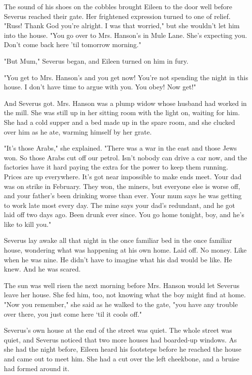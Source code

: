\documentclass[a4paper,11pt]{article}
\begin{document}
The sound of his shoes on the cobbles brought Eileen to the door well before Severus reached their gate. Her frightened expression turned to one of relief. "Russ! Thank God you're alright. I was that worried," but she wouldn't let him into the house. "You go over to Mrs. Hanson's in Mule Lane. She's expecting you. Don't come back here 'til tomorrow morning."

"But Mum," Severus began, and Eileen turned on him in fury.

"You get to Mrs. Hanson's and you get now! You're not spending the night in this house. I don't have time to argue with you. You obey! Now get!"

And Severus got. Mrs. Hanson was a plump widow whose husband had worked in the mill. She was still up in her sitting room with the light on, waiting for him. She had a cold supper and a bed made up in the spare room, and she clucked over him as he ate, warming himself by her grate.

"It's those Arabs," she explained. "There was a war in the east and those Jews won. So those Arabs cut off our petrol. Isn't nobody can drive a car now, and the factories have it hard paying the extra for the power to keep them running. Prices are up everywhere. It's got near impossible to make ends meet. Your dad was on strike in February. They won, the miners, but everyone else is worse off, and your father's been drinking worse than ever. Your mum says he was getting to work late most every day. The mine says your dad's redundant, and he got laid off two days ago. Been drunk ever since. You go home tonight, boy, and he's like to kill you."

Severus lay awake all that night in the once familiar bed in the once familiar house, wondering what was happening at his own home. Laid off. No money. Like when he was nine. He didn't have to imagine what his dad would be like. He knew. And he was scared.

The sun was well risen the next morning before Mrs. Hanson would let Severus leave her house. She fed him, too, not knowing what the boy might find at home. "Now you remember," she said as he walked to the gate, "you have any trouble over there, you just come here `til it cools off."

Severus's own house at the end of the street was quiet. The whole street was quiet, and Severus noticed that two more houses had boarded-up windows. As she had the night before, Eileen heard his footsteps before he reached the house and came out to meet him. She had a cut over the left cheekbone, and a bruise had formed around it.
\end{document}
